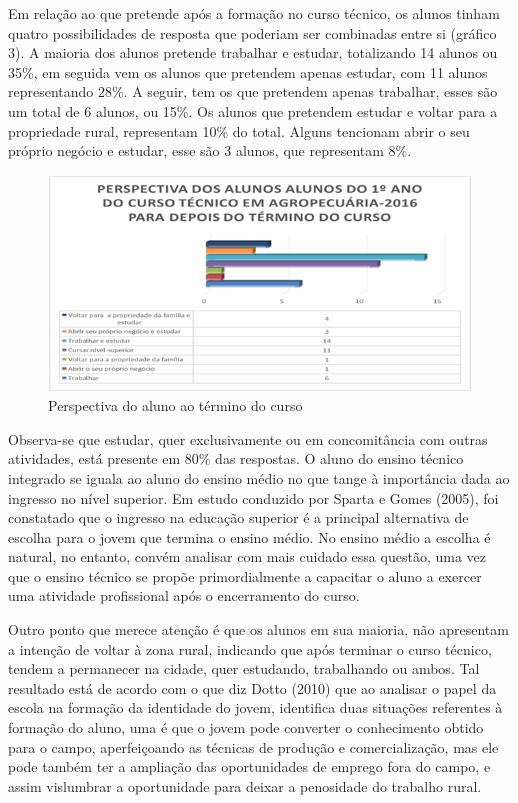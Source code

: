 \documentclass[article,12pt,onesidea,4paper,english,brazil]{abntex2}
\begin{document}
	Em relação ao que pretende após a formação no curso técnico, os alunos tinham quatro possibilidades de resposta que poderiam ser combinadas entre si (gráfico 3). A maioria dos alunos pretende trabalhar e estudar, totalizando 14 alunos ou 35\%, em seguida vem os alunos que pretendem apenas estudar, com 11 alunos representando 28\%. A seguir, tem os que pretendem apenas trabalhar, esses são um total de 6 alunos, ou 15\%. Os alunos que pretendem estudar e voltar para a propriedade rural, representam 10\% do total. Alguns tencionam abrir o seu próprio negócio e estudar, esse são 3 alunos, que representam 8\%.
	\begin{figure}[h]
		\centering
		\includegraphics[width=0.7\linewidth]{pip-artigo14-01}
		\caption{Perspectiva do aluno ao término do curso}
		\label{fig:pip-artigo14-01}
	\end{figure}
Observa-se que estudar, quer exclusivamente ou em concomitância com outras atividades, está presente em 80\% das respostas. O aluno do ensino técnico integrado se iguala ao aluno do ensino médio no que tange à importância dada ao ingresso no nível superior. Em estudo conduzido por Sparta e Gomes (2005), foi constatado que o ingresso na educação superior é a principal alternativa de escolha para o jovem que termina o ensino médio. No ensino médio a escolha é natural, no entanto, convém analisar com mais cuidado essa questão, uma vez que o ensino técnico se propõe primordialmente a capacitar o aluno a exercer uma atividade profissional após o encerramento do curso.

Outro ponto que merece atenção é que os alunos em sua maioria, não apresentam a intenção de voltar à zona rural, indicando que após terminar o curso técnico, tendem a permanecer na cidade, quer estudando, trabalhando ou ambos. Tal resultado está de acordo com o que diz Dotto (2010) que ao analisar o papel da escola na formação da identidade do jovem, identifica duas situações referentes à formação do aluno, uma é que o jovem pode converter o conhecimento obtido para o campo, aperfeiçoando as técnicas de produção e comercialização, mas ele pode também ter a ampliação das oportunidades de emprego fora do campo, e assim vislumbrar a oportunidade para deixar a penosidade do trabalho rural.
\end{document}
